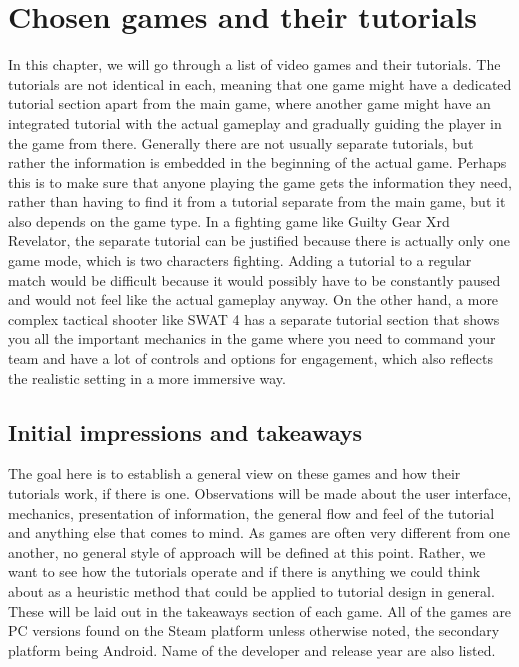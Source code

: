 \chapter{Chosen games and their tutorials}

In this chapter, we will go through a list of video games and their tutorials. The tutorials are not identical in each, meaning that one game might have a dedicated tutorial section apart from the main game, where another game might have an integrated tutorial with the actual gameplay and gradually guiding the player in the game from there. Generally there are not usually separate tutorials, but rather the information is embedded in the beginning of the actual game. Perhaps this is to make sure that anyone playing the game gets the information they need, rather than having to find it from a tutorial separate from the main game, but it also depends on the game type. In a fighting game like Guilty Gear Xrd Revelator, the separate tutorial can be justified because there is actually only one game mode, which is two characters fighting. Adding a tutorial to a regular match would be difficult because it would possibly have to be constantly paused and would not feel like the actual gameplay anyway. On the other hand, a more complex tactical  shooter like SWAT 4 has a separate tutorial section that shows you all the important mechanics in the game where you need to command your team and have a lot of controls and options for engagement, which also reflects the realistic setting in a more immersive way.
\section{Initial impressions and takeaways}

The goal here is to establish a general view on these games and how their tutorials work, if there is one. Observations will be made about the user interface, mechanics, presentation of information, the general flow and feel of the tutorial and anything else that comes to mind. As games are often very different from one another, no general style of approach will be defined at this point. Rather, we want to see how the tutorials operate and if there is anything we could think about as a heuristic method that could be applied to tutorial design in general. These will be laid out in the takeaways section of each game. All of the games are PC versions found on the Steam platform unless otherwise noted, the secondary platform being Android. Name of the developer and release year are also listed.

